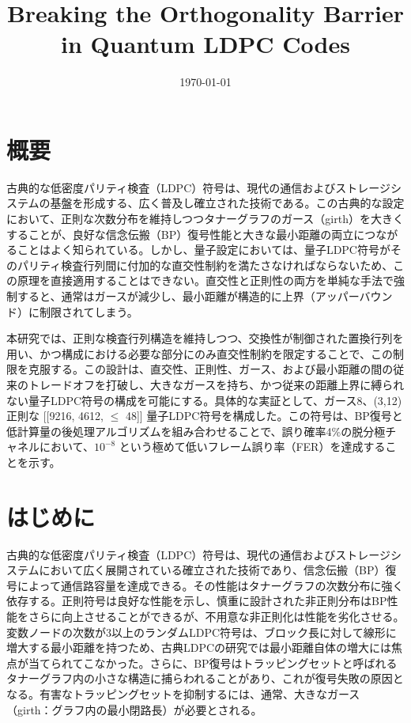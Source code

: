 \documentclass[a4paper,11pt,dvipdfmx]{jsarticle}
\theoremstyle{definition}
\begin{document}
\title{Breaking the Orthogonality Barrier in Quantum LDPC Codes}
\author{}
\date{\today}
\maketitle
\tableofcontents

\section{概要}
古典的な低密度パリティ検査（LDPC）符号は、現代の通信およびストレージシステムの基盤を形成する、広く普及し確立された技術である。この古典的な設定において、正則な次数分布を維持しつつタナーグラフのガース（girth）を大きくすることが、良好な信念伝搬（BP）復号性能と大きな最小距離の両立につながることはよく知られている。しかし、量子設定においては、量子LDPC符号がそのパリティ検査行列間に付加的な直交性制約を満たさなければならないため、この原理を直接適用することはできない。直交性と正則性の両方を単純な手法で強制すると、通常はガースが減少し、最小距離が構造的に上界（アッパーバウンド）に制限されてしまう。

本研究では、正則な検査行列構造を維持しつつ、交換性が制御された置換行列を用い、かつ構成における必要な部分にのみ直交性制約を限定することで、この制限を克服する。この設計は、直交性、正則性、ガース、および最小距離の間の従来のトレードオフを打破し、大きなガースを持ち、かつ従来の距離上界に縛られない量子LDPC符号の構成を可能にする。具体的な実証として、ガース8、(3,12)正則な [[9216, 4612, $\le$ 48]] 量子LDPC符号を構成した。この符号は、BP復号と低計算量の後処理アルゴリズムを組み合わせることで、誤り確率4\%の脱分極チャネルにおいて、$10^{-8}$ という極めて低いフレーム誤り率（FER）を達成することを示す。

\section{はじめに}

古典的な低密度パリティ検査（LDPC）符号は、現代の通信およびストレージシステムにおいて広く展開されている確立された技術であり、信念伝搬（BP）復号によって通信路容量を達成できる。その性能はタナーグラフの次数分布に強く依存する。正則符号は良好な性能を示し、慎重に設計された非正則分布はBP性能をさらに向上させることができるが、不用意な非正則化は性能を劣化させる。変数ノードの次数が3以上のランダムLDPC符号は、ブロック長に対して線形に増大する最小距離を持つため、古典LDPCの研究では最小距離自体の増大には焦点が当てられてこなかった。さらに、BP復号はトラッピングセットと呼ばれるタナーグラフ内の小さな構造に捕らわれることがあり、これが復号失敗の原因となる。有害なトラッピングセットを抑制するには、通常、大きなガース（girth：グラフ内の最小閉路長）が必要とされる。
\end{document}
